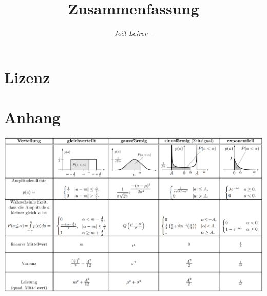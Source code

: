\documentclass[margin=normal]{tex/hsrzf}
\author{\textsl{Joël Leirer} -- \texttt{\theauthoremail}}
\title{\texttt{\themodule} Zusammenfassung}
\date{\thesemester}
\begin{document}

\maketitle



\section*{Lizenz}
\doclicenseThis
\clearpage
\tableofcontents

\clearpage
\setcounter{page}{1}







\section{Anhang}

\includegraphics{img/Tabelle_Dichtefunktionen.png}
\end{document}
